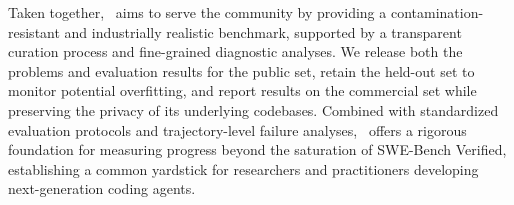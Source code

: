 


Taken together, \benchmarkname~aims to serve the community by providing a contamination-resistant and industrially realistic benchmark, supported by a transparent curation process and fine-grained diagnostic analyses. We release both the problems and evaluation results for the public set, retain the held-out set to monitor potential overfitting, and report results on the commercial set while preserving the privacy of its underlying codebases. Combined with standardized evaluation protocols and trajectory-level failure analyses, \benchmarkname~offers a rigorous foundation for measuring progress beyond the saturation of SWE-Bench Verified, establishing a common yardstick for researchers and practitioners developing next-generation coding agents.



